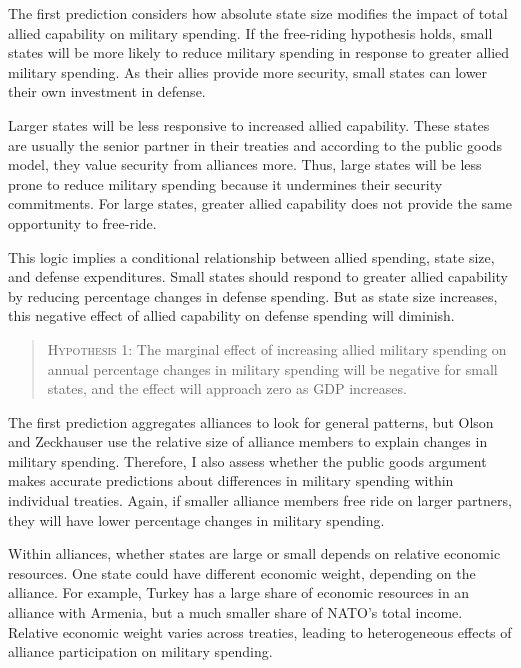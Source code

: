 \documentclass[12pt]{article}
\begin{document}
The first prediction considers how absolute state size modifies the impact of total allied capability on military spending. 
If the free-riding hypothesis holds, small states will be more likely to reduce military spending in response to greater allied military spending.  
As their allies provide more security, small states can lower their own investment in defense. 

 
Larger states will be less responsive to increased allied capability. 
These states are usually the senior partner in their treaties and according to the public goods model, they value security from alliances more. 
Thus, large states will be less prone to reduce military spending because it undermines their security commitments. 
For large states, greater allied capability does not provide the same opportunity to free-ride.


This logic implies a conditional relationship between allied spending, state size, and defense expenditures. 
Small states should respond to greater allied capability by reducing percentage changes in defense spending. 
But as state size increases, this negative effect of allied capability on defense spending will diminish. 


\begin{quote}
\textsc{Hypothesis 1}: The marginal effect of increasing allied military spending on annual percentage changes in military spending will be negative for small states, and the effect will approach zero as GDP increases. 
\end{quote}


The first prediction aggregates alliances to look for general patterns, but Olson and Zeckhauser use the relative size of alliance members to explain changes in military spending. 
Therefore, I also assess whether the public goods argument makes accurate predictions about differences in military spending within individual treaties. 
Again, if smaller alliance members free ride on larger partners, they will have lower percentage changes in military spending.  

 
Within alliances, whether states are large or small depends on relative economic resources.
One state could have different economic weight, depending on the alliance. 
For example, Turkey has a large share of economic resources in an alliance with Armenia, but a much smaller share of NATO's total income. 
Relative economic weight varies across treaties, leading to heterogeneous effects of alliance participation on military spending. 
\end{document}
